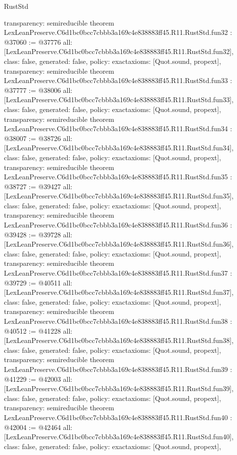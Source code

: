 \begin{lexlean}{RustStd}
\begin{coremodule}
{  transparency: semireducible
}
theorem LexLeanPreserve.C6d1bc0bcc7cbbb3a169c4e838883ff45.R11.RustStd.fun32 : @37060 := @37776 {
  all: [LexLeanPreserve.C6d1bc0bcc7cbbb3a169c4e838883ff45.R11.RustStd.fun32],
  class: false,
  generated: false,
  policy: exact{axioms: [Quot.sound, propext]},
  transparency: semireducible
}
theorem LexLeanPreserve.C6d1bc0bcc7cbbb3a169c4e838883ff45.R11.RustStd.fun33 : @37777 := @38006 {
  all: [LexLeanPreserve.C6d1bc0bcc7cbbb3a169c4e838883ff45.R11.RustStd.fun33],
  class: false,
  generated: false,
  policy: exact{axioms: [Quot.sound, propext]},
  transparency: semireducible
}
theorem LexLeanPreserve.C6d1bc0bcc7cbbb3a169c4e838883ff45.R11.RustStd.fun34 : @38007 := @38726 {
  all: [LexLeanPreserve.C6d1bc0bcc7cbbb3a169c4e838883ff45.R11.RustStd.fun34],
  class: false,
  generated: false,
  policy: exact{axioms: [Quot.sound, propext]},
  transparency: semireducible
}
theorem LexLeanPreserve.C6d1bc0bcc7cbbb3a169c4e838883ff45.R11.RustStd.fun35 : @38727 := @39427 {
  all: [LexLeanPreserve.C6d1bc0bcc7cbbb3a169c4e838883ff45.R11.RustStd.fun35],
  class: false,
  generated: false,
  policy: exact{axioms: [Quot.sound, propext]},
  transparency: semireducible
}
theorem LexLeanPreserve.C6d1bc0bcc7cbbb3a169c4e838883ff45.R11.RustStd.fun36 : @39428 := @39728 {
  all: [LexLeanPreserve.C6d1bc0bcc7cbbb3a169c4e838883ff45.R11.RustStd.fun36],
  class: false,
  generated: false,
  policy: exact{axioms: [Quot.sound, propext]},
  transparency: semireducible
}
theorem LexLeanPreserve.C6d1bc0bcc7cbbb3a169c4e838883ff45.R11.RustStd.fun37 : @39729 := @40511 {
  all: [LexLeanPreserve.C6d1bc0bcc7cbbb3a169c4e838883ff45.R11.RustStd.fun37],
  class: false,
  generated: false,
  policy: exact{axioms: [Quot.sound, propext]},
  transparency: semireducible
}
theorem LexLeanPreserve.C6d1bc0bcc7cbbb3a169c4e838883ff45.R11.RustStd.fun38 : @40512 := @41228 {
  all: [LexLeanPreserve.C6d1bc0bcc7cbbb3a169c4e838883ff45.R11.RustStd.fun38],
  class: false,
  generated: false,
  policy: exact{axioms: [Quot.sound, propext]},
  transparency: semireducible
}
theorem LexLeanPreserve.C6d1bc0bcc7cbbb3a169c4e838883ff45.R11.RustStd.fun39 : @41229 := @42003 {
  all: [LexLeanPreserve.C6d1bc0bcc7cbbb3a169c4e838883ff45.R11.RustStd.fun39],
  class: false,
  generated: false,
  policy: exact{axioms: [Quot.sound, propext]},
  transparency: semireducible
}
theorem LexLeanPreserve.C6d1bc0bcc7cbbb3a169c4e838883ff45.R11.RustStd.fun40 : @42004 := @42464 {
  all: [LexLeanPreserve.C6d1bc0bcc7cbbb3a169c4e838883ff45.R11.RustStd.fun40],
  class: false,
  generated: false,
  policy: exact{axioms: [Quot.sound, propext]},
}
\end{coremodule}
\end{lexlean}
